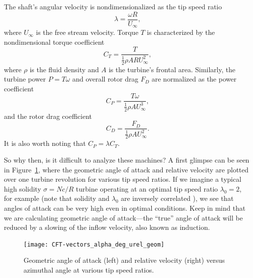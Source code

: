 The shaft's angular velocity is nondimensionalized as the tip speed ratio
\begin{equation}
    \lambda = \frac{\omega R}{U_\infty},
    \label{eq:lambda}
\end{equation}
where $U_\infty$ is the free stream velocity.
Torque $T$ is characterized by the nondimensional torque coefficient 
\begin{equation}
    C_T = \frac{T}{\frac{1}{2} \rho A R U_\infty^2},
    \label{eq:ct}
\end{equation}
where $\rho$ is the fluid density and $A$ is the turbine's frontal area.
Similarly, the turbine power $P = T\omega$ and overall rotor drag $F_D$ are
normalized as the power coefficient
\begin{equation}
    C_P = \frac{T \omega}{\frac{1}{2} \rho A U_\infty^3},
    \label{eq:cp}
\end{equation}
and the rotor drag coefficient
\begin{equation}
    C_D = \frac{F_D}{\frac{1}{2} \rho A U_\infty^2}.
    \label{eq:cd}
\end{equation}
It is also worth noting that $C_P = \lambda C_T$.

So why then, is it difficult to analyze these machines? A first glimpse can be
seen in Figure~\ref{fig:geom-alpha-urel}, where the geometric angle of attack
and relative velocity are plotted over one turbine revolution for various tip
speed ratios. If we imagine a typical high solidity $\sigma = Nc/R$ turbine
operating at an optimal tip speed ratio $\lambda_0 = 2$, for example
\cite{Howell2010} (note that solidity and $\lambda_0$ are inversely correlated
\cite{Templin1974}), we see that angles of attack can be very high even in
optimal conditions. Keep in mind that we are calculating geometric angle of
attack---the ``true'' angle of attack will be reduced by a slowing of the inflow
velocity, also known as induction.

\begin{figure}[ht]
    \centering
    
    \texttt{[image: CFT-vectors\_alpha\_deg\_urel\_geom]}
    
    \caption{Geometric angle of attack (left) and relative velocity (right)
        versus azimuthal angle at various tip speed ratios.}
    
    \label{fig:geom-alpha-urel}
\end{figure}

